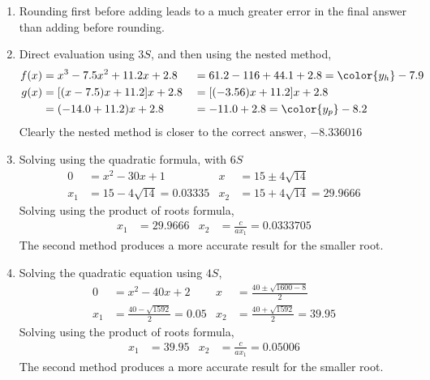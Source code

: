 \begin{enumerate}
    \item Rounding first before adding leads to a much greater error in the final answer
          than adding before rounding.

    \item Direct evaluation using $ 3S $, and then using the nested method,
          \begin{align}
              f(x) & = x^3 - 7.5x^2 + 11.2 x + 2.8               &
                   & = 61.2 - 116 + 44.1 + 2.8 = \color{y_h}-7.9   \\
              g(x) & = [(x-7.5)x + 11.2]x + 2.8                  &
                   & = [(-3.56)x + 11.2]x + 2.8                    \\
                   & = (-14.0 + 11.2)x + 2.8                     &
                   & = -11.0 + 2.8 = \color{y_p}-8.2
          \end{align}
          Clearly the nested method is closer to the correct answer, $ \num{-8.336016} $

    \item Solving using the quadratic formula, with $ 6S $
          \begin{align}
              0   & = x^2 - 30x + 1             &
              x   & = 15 \pm 4 \sqrt{14}          \\
              x_1 & = 15 - 4\sqrt{14} = 0.03335 &
              x_2 & = 15 + 4\sqrt{14} = 29.9666
          \end{align}
          Solving using the product of roots formula,
          \begin{align}
              x_1 & = 29.9666 & x_2 & = \frac{c}{ax_1} = 0.0333705
          \end{align}
          The second method produces a more accurate result for the smaller root.

    \item Solving the quadratic equation using $ 4S $,
          \begin{align}
              0   & = x^2 - 40x + 2                      &
              x   & = \frac{40 \pm \sqrt{1600 - 8}}{2}     \\
              x_1 & = \frac{40 - \sqrt{1592}}{2} = 0.05  &
              x_2 & = \frac{40 + \sqrt{1592}}{2} = 39.95
          \end{align}
          Solving using the product of roots formula,
          \begin{align}
              x_1 & = 39.95 & x_2 & = \frac{c}{ax_1} = 0.05006
          \end{align}
          The second method produces a more accurate result for the smaller root.


\end{enumerate}
